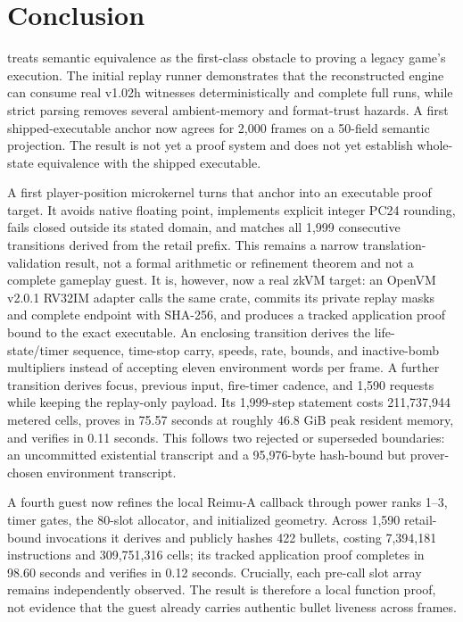 \section{Conclusion}

\project{} treats semantic equivalence as the first-class obstacle to proving
a legacy game's execution.  The initial replay runner demonstrates that the
reconstructed engine can consume real v1.02h witnesses deterministically and
complete full runs, while strict parsing removes several ambient-memory and
format-trust hazards.  A first shipped-executable anchor now agrees for 2,000
frames on a 50-field semantic projection.  The result is not yet a proof system and
does not yet establish whole-state equivalence with the shipped executable.

A first  player-position microkernel turns that anchor into an
executable proof target.  It avoids native floating point, implements explicit
integer PC24 rounding, fails closed outside its stated domain, and matches all
1,999 consecutive transitions derived from the retail prefix.  This remains a
narrow translation-validation result, not a formal arithmetic or refinement
theorem and not a complete gameplay guest.  It is, however, now a real zkVM
target: an OpenVM v2.0.1 RV32IM adapter calls the same crate, commits its private
replay masks and complete endpoint with SHA-256, and produces a tracked
application proof bound to the exact executable.  An enclosing transition
derives the life-state/timer sequence, time-stop carry, speeds, rate, bounds,
and inactive-bomb multipliers instead of accepting eleven environment words
per frame.  A further transition derives focus, previous input, fire-timer
cadence, and 1,590  requests while keeping the replay-only
payload.  Its 1,999-step statement costs 211,737,944 metered cells, proves in
75.57 seconds at roughly 46.8 GiB peak resident memory, and verifies in 0.11
seconds.  This follows two rejected or superseded boundaries: an uncommitted
existential transcript and a 95,976-byte hash-bound but prover-chosen
environment transcript.

A fourth guest now refines the local Reimu-A callback through power ranks
1--3, timer gates, the 80-slot allocator, and initialized geometry.  Across
1,590 retail-bound invocations it derives and publicly hashes 422 bullets,
costing 7,394,181 instructions and 309,751,316 cells; its tracked application
proof completes in 98.60 seconds and verifies in 0.12 seconds.  Crucially, each
pre-call slot array remains independently observed.  The result is therefore a
local function proof, not evidence that the guest already carries authentic
bullet liveness across frames.

